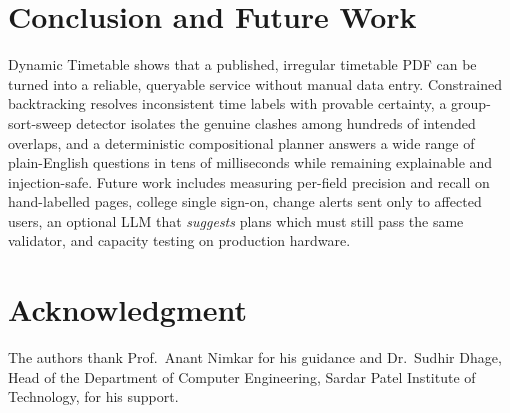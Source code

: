\documentclass[conference]{IEEEtran}
\begin{document}
\section{Conclusion and Future Work}
Dynamic Timetable shows that a published, irregular timetable PDF can be turned into a reliable,
queryable service without manual data entry. Constrained backtracking resolves inconsistent time labels
with provable certainty, a group-sort-sweep detector isolates the genuine clashes among hundreds of
intended overlaps, and a deterministic compositional planner answers a wide range of plain-English
questions in tens of milliseconds while remaining explainable and injection-safe. Future work includes
measuring per-field precision and recall on hand-labelled pages, college single sign-on, change alerts
sent only to affected users, an optional LLM that \emph{suggests} plans which must still pass the same
validator, and capacity testing on production hardware.

\section*{Acknowledgment}
The authors thank Prof.\ Anant Nimkar for his guidance and Dr.\ Sudhir Dhage, Head of the Department of
Computer Engineering, Sardar Patel Institute of Technology, for his support.


\end{document}

